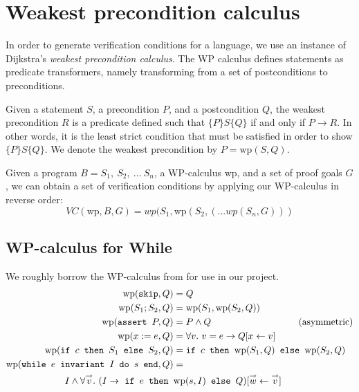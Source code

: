 \section{Weakest precondition calculus} %

In order to generate verification conditions for a language,
we use an instance of Dijkstra's \textit{weakest precondition calculus}.
The WP calculus defines statements as predicate transformers,
namely transforming from a set of postconditions to preconditions.

\newcommand{\wpp}{\mathrm{wp}}
\renewcommand{\implies}{\rightarrow}

Given a statement $S$, a precondition $P$, and a postcondition $Q$,
the weakest precondition $R$ is a predicate defined
such that $\{P\} S \{Q\}$ if and only if $P \implies R$.
In other words, it is the least strict condition that must be satisfied
in order to show $\{P\} S \{Q\}$.
We denote the weakest precondition by $P = \wpp(S, Q)$.

Given a program $B = S_1,~S_2,~...~S_n$, a WP-calculus $\wpp$, and a set of proof goals $G$,
we can obtain a set of verification conditions by applying our WP-calculus in reverse order:
\[
    VC(\wpp, B, G) = wp(S_1, \wpp(S_2, (... wp(S_n, G)))
\]

\subsection{WP-calculus for While} \label{sec:whilewp}

We roughly borrow the WP-calculus from \cite{jlamp} for use in our project.
\begin{align}
    \wpp(\inl{skip}, Q) &= Q \\
    \wpp(S_1; S_2, Q) &= \wpp(S_1, \wpp(S_2, Q)) \\
    \wpp(\inl{assert } P, Q) &= P \land Q ~~~~~~~~~~~~~~~~~~~~~~~~~~~~(\text{asymmetric})\\
    \wpp(x := e, Q) &= \forall v.~v = e \implies Q[x \leftarrow v] \\
    \wpp(\inl{if } c \inl{ then } S_1 \inl{ else } S_2, Q) &=
        \inl{if } c \inl{ then } \wpp(S_1, Q) \inl{ else } \wpp(S_2, Q) \\
    \wpp(\inl{while } e \inl{ invariant } I \inl{ do } s \inl{ end}, Q) &=\\
        I \land \forall \overset{\rightarrow} v. ~
        (I \implies \
        \inl{if } e \inl{ then } &\wpp(s, I) \inl{ else } Q)
        [\overset{\rightarrow} w \leftarrow \overset{\rightarrow} v]
\end{align}

